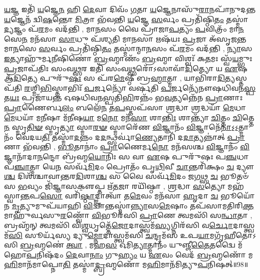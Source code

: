  \ul{𑌯}\-𑌜𑍍𑌞 𑌇𑌤𑌿᳴ \ul{𑌯}\-𑌜𑍍𑌞𑍇\-\ul{𑌨} 𑌹𑌿 \ul{𑌦𑍇}\-𑌵𑌾 𑌦𑌿𑌵𑌂᳴ \ul{𑌗}\-𑌤𑌾 \ul{𑌯}\-𑌜𑍍𑌞𑍇𑌨𑌾𑌸𑍁᳴\-\ul{𑌰𑌾}\-𑌨𑌪𑌾᳴𑌨𑍁𑌦𑌨𑍍𑌤 \ul{𑌯}\-𑌜𑍍𑌞𑍇𑌨᳴ 𑌦𑍍𑌵𑌿\-\ul{𑌷}\-𑌨𑍍𑌤𑍋 \ul{𑌮𑌿}\-𑌤𑍍𑌰𑌾 𑌭᳴𑌵𑌨𑍍𑌤𑌿 \ul{𑌯}\-𑌜𑍍𑌞𑍇 \ul{𑌸}\-𑌰𑍍𑌵𑌂 𑌪𑍍𑌰𑌤𑌿᳴𑌷𑍍𑌠𑌿\-\ul{𑌤𑌂} 𑌤𑌸𑍍𑌮𑌾॑\-\ul{𑌦𑍍𑌯}\-𑌜𑍍𑌞𑌂 𑌪᳴\-\ul{𑌰}\-𑌮𑌂 𑌵𑌦᳴𑌨𑍍𑌤𑌿 \sep 
 𑌮𑌾\-\ul{𑌨}\-𑌸𑌂 𑌵𑍈 𑌪𑍍𑌰𑌾᳴𑌜𑌾\-\ul{𑌪}\-𑌤𑍍𑌯𑌂 \ul{𑌪}\-𑌵𑌿𑌤𑍍𑌰𑌂᳴ 𑌮𑌾\-\ul{𑌨}\-𑌸𑍇\-\ul{𑌨} 𑌮𑌨᳴𑌸𑌾 \ul{𑌸𑌾}\-𑌧𑍁 𑌪᳴𑌶𑍍𑌯𑌤𑌿 𑌮𑌾\-\ul{𑌨}\-𑌸𑌾 𑌋𑌷᳴𑌯𑌃 \ul{𑌪𑍍𑌰}\-𑌜𑌾 𑌅᳴𑌸𑍃𑌜𑌨𑍍𑌤 𑌮𑌾\-\ul{𑌨}\-𑌸𑍇 \ul{𑌸}\-𑌰𑍍𑌵𑌂 𑌪𑍍𑌰𑌤𑌿᳴𑌷𑍍𑌠𑌿\-\ul{𑌤𑌂} 𑌤𑌸𑍍𑌮𑌾॑𑌨𑍍𑌮𑌾\-\ul{𑌨}\-𑌸𑌂 𑌪᳴\-\ul{𑌰}\-𑌮𑌂 𑌵𑌦᳴𑌨𑍍𑌤𑌿 \sep
 \ul{𑌨𑍍𑌯𑌾}\-𑌸 \ul{𑌇}\-𑌤𑍍𑌯𑌾𑌹𑍁᳴𑌰𑍍𑌮\-\ul{𑌨𑍀}\-𑌷𑌿𑌣𑍋॑ \ul{𑌬𑍍𑌰}\-𑌹𑍍𑌮𑌾𑌣𑌂᳴ \ul{𑌬𑍍𑌰}\-𑌹𑍍𑌮𑌾 𑌵𑌿𑌶𑍍𑌵𑌃᳴ 𑌕\-\ul{𑌤}\-𑌮𑌃 𑌸𑍍𑌵᳴\-\ul{𑌯}\-𑌮𑍍𑌭𑍁𑌃 \ul{𑌪𑍍𑌰}\-𑌜𑌾𑌪᳴𑌤𑌿𑌃 𑌸𑌂𑌵\-\ul{𑌥𑍍𑌸}\-𑌰 𑌇𑌤𑌿᳴ 𑌸𑌂𑌵\-\ul{𑌥𑍍𑌸}\-𑌰𑍋᳴𑌽𑌸𑌾𑌵𑌾᳴\-\ul{𑌦𑌿}\-𑌤𑍍𑌯𑍋 𑌯 \ul{𑌏}\-𑌷 𑌆᳴\-\ul{𑌦𑌿}\-𑌤𑍍𑌯𑍇 𑌪𑍁𑌰𑍁᳴\-\ul{𑌷𑌃} 𑌸 𑌪᳴𑌰\-\ul{𑌮𑍇}\-𑌷𑍍𑌠𑍀 𑌬𑍍𑌰\-\ul{𑌹𑍍𑌮𑌾}\-𑌤𑍍𑌮𑌾 \sep
 𑌯𑌾𑌭𑌿᳴𑌰𑌾\-\ul{𑌦𑌿}\-𑌤𑍍𑌯𑌸𑍍𑌤𑌪᳴𑌤𑌿 \ul{𑌰}\-𑌶𑍍𑌮𑌿\-\ul{𑌭𑌿}\-𑌸𑍍𑌤𑌾𑌭𑌿𑌃᳴ \ul{𑌪}\-𑌰𑍍𑌜𑌨𑍍𑌯𑍋᳴ 𑌵𑌰𑍍\mbox{}𑌷𑌤𑌿 \ul{𑌪}\-𑌰𑍍𑌜𑌨𑍍𑌯𑍇᳴𑌨𑍗𑌷𑌧𑌿𑌵𑌨\-\ul{𑌸𑍍𑌪}\-𑌤\-\ul{𑌯𑌃} 𑌪𑍍𑌰𑌜𑌾᳴𑌯𑌨𑍍𑌤 𑌓𑌷𑌧𑌿𑌵𑌨\-\ul{𑌸𑍍𑌪}\-𑌤𑌿\-\ul{𑌭𑌿}\-𑌰𑌨𑍍𑌨𑌂᳴ 𑌭\-\ul{𑌵}\-𑌤𑍍𑌯𑌨𑍍𑌨𑍇᳴𑌨 \ul{𑌪𑍍𑌰𑌾}\-𑌣𑌾𑌃 \ul{𑌪𑍍𑌰𑌾}\-𑌣𑍈𑌰𑍍𑌬\-\ul{𑌲𑌂} 𑌬𑌲𑍇᳴\-\ul{𑌨} 𑌤\-\ul{𑌪}\-𑌸𑍍𑌤𑌪᳴𑌸𑌾 \ul{𑌶𑍍𑌰}\-𑌦𑍍𑌧𑌾 \ul{𑌶𑍍𑌰}\-𑌦𑍍𑌧𑌯𑌾᳴ \ul{𑌮𑍇}\-𑌧𑌾 \ul{𑌮𑍇}\-𑌧𑌯𑌾᳴ 𑌮\-\ul{𑌨𑍀}\-𑌷𑌾 𑌮᳴\-\ul{𑌨𑍀}\-𑌷\-\ul{𑌯𑌾} 𑌮\-\ul{𑌨𑍋} 𑌮𑌨᳴\-\ul{𑌸𑌾} 𑌶𑌾\-\ul{𑌨𑍍𑌤𑌿𑌃} 𑌶𑌾𑌨𑍍𑌤𑍍𑌯𑌾᳴ \ul{𑌚𑌿}\-𑌤𑍍𑌤𑌂 \ul{𑌚𑌿}\-𑌤𑍍𑌤𑍇\-\ul{𑌨} 𑌸𑍍𑌮𑍃\-\ul{𑌤𑌿}\-\-\ul{𑍟} 𑌸𑍍𑌮𑍃\-\ul{𑌤𑍍𑌯𑌾} 𑌸𑍍𑌮𑌾\-\ul{𑌰}\-\-\ul{𑍟} 𑌸𑍍𑌮𑌾𑌰𑍇᳴𑌣 \ul{𑌵𑌿}\-𑌜𑍍𑌞𑌾𑌨𑌂᳴  \ul{𑌵𑌿}\-𑌜𑍍𑌞𑌾𑌨𑍇᳴\-\ul{𑌨𑌾}\-𑌽॒𑌽॒𑌤𑍍𑌮𑌾𑌨𑌂᳴ 𑌵𑍇𑌦𑌯\-\ul{𑌤𑌿} 𑌤𑌸𑍍𑌮𑌾᳴\-\ul{𑌦}\-𑌨𑍍𑌨𑌂 𑌦\-\ul{𑌦}\-𑌨𑍍𑌥𑍍𑌸𑌰𑍍𑌵𑌾॑\-\ul{𑌣𑍍𑌯𑍇}\-𑌤𑌾𑌨𑌿᳴ 𑌦\-\ul{𑌦𑌾}\-𑌤𑍍𑌯𑌨𑍍𑌨𑌾॑𑌤𑍍 \ul{𑌪𑍍𑌰𑌾}\-𑌣𑌾 𑌭᳴𑌵𑌨𑍍𑌤𑌿 \sep
  \ul{𑌭𑍂}\-𑌤𑌾𑌨𑌾𑌂॑ \ul{𑌪𑍍𑌰𑌾}\-𑌣𑍈𑌰𑍍𑌮\-\ul{𑌨𑍋} 𑌮𑌨᳴𑌸𑌶𑍍𑌚 \ul{𑌵𑌿}\-𑌜𑍍𑌞𑌾𑌨𑌂᳴  \ul{𑌵𑌿}\-𑌜𑍍𑌞𑌾𑌨𑌾᳴𑌦𑌾\-\ul{𑌨}\-𑌨𑍍𑌦𑍋 𑌬𑍍𑌰᳴𑌹𑍍𑌮\-\ul{𑌯𑍋}\-𑌨𑌿𑌃 𑌸 𑌵𑌾 \ul{𑌏}\-𑌷 𑌪𑍁𑌰𑍁᳴𑌷𑌃 𑌪\-\ul{𑌞𑍍𑌚}\-𑌧𑌾 𑌪᳴\-\ul{𑌞𑍍𑌚𑌾}\-𑌤𑍍𑌮𑌾 𑌯𑍇\-\ul{𑌨} 𑌸𑌰𑍍𑌵᳴\-\ul{𑌮𑌿}\-𑌦𑌂 𑌪𑍍𑌰𑍋𑌤𑌂᳴ 𑌪𑍃\-\ul{𑌥𑌿}\-𑌵𑍀 \ul{𑌚𑌾}\-𑌨𑍍𑌤𑌰𑌿᳴𑌕𑍍𑌷𑌂 \ul{𑌚} 𑌦𑍍𑌯𑍗\-\ul{𑌶𑍍𑌚} 𑌦𑌿𑌶᳴𑌶𑍍𑌚𑌾𑌵𑌾𑌨𑍍𑌤𑌰\-\ul{𑌦𑌿}\-𑌶𑌾\-\ul{𑌶𑍍𑌚} 𑌸 𑌵𑍈 𑌸𑌰𑍍𑌵᳴\-\ul{𑌮𑌿}\-𑌦𑌂 𑌜\-\ul{𑌗}\-𑌥𑍍𑌸 \ul{𑌚} 𑌭𑍂𑌤𑍞᳴ 𑌸 \ul{𑌭}\-𑌵𑍍𑌯𑌂 𑌜𑌿᳴𑌜𑍍𑌞𑌾𑌸𑌕𑍢॒𑌪𑍍𑌤 𑌋᳴\-\ul{𑌤}\-𑌜𑌾 𑌰𑌯𑌿᳴𑌷𑍍𑌠𑌾 \sep
  \ul{𑌶𑍍𑌰}\-𑌦𑍍𑌧𑌾 \ul{𑌸}\-𑌤𑍍𑌯𑍋 𑌮𑌹᳴𑌸𑍍𑌵𑌾\-\ul{𑌨𑍍𑌤}\-𑌪\-\ul{𑌸𑍋} 𑌵𑌰𑌿᳴\-\ul{𑌷𑍍𑌠𑌾}\-𑌦𑍍𑌜𑍍𑌞𑌾𑌤𑍍𑌵𑌾᳴ 𑌤\-\ul{𑌮𑍇}\-𑌵𑌂 𑌮𑌨᳴𑌸𑌾 \ul{𑌹𑍃}\-𑌦𑌾 \ul{𑌚} 𑌭𑍂𑌯𑍋᳴ 𑌨 \ul{𑌮𑍃}\-𑌤𑍍𑌯𑍁𑌮𑍁𑌪᳴𑌯𑌾𑌹𑌿 \ul{𑌵𑌿}\-𑌦𑍍𑌵𑌾𑌨𑍍𑌤𑌸𑍍𑌮𑌾॑\-\ul{𑌨𑍍𑌨𑍍𑌯𑌾}\-𑌸\-\ul{𑌮𑍇}\-𑌷𑌾𑌂 𑌤𑌪᳴𑌸𑌾𑌮𑌤𑌿𑌰𑌿\-\ul{𑌕𑍍𑌤}\-𑌮𑌾𑌹𑍁᳴𑌰𑍍𑌵𑌸𑍁\-\ul{𑌰}\-𑌣𑍍𑌵𑍋᳴ \ul{𑌵𑌿}\-𑌭𑍂𑌰᳴𑌸𑌿 \ul{𑌪𑍍𑌰𑌾}\-𑌣𑍇 𑌤𑍍𑌵𑌮𑌸𑌿᳴ 𑌸\-\ul{𑌨𑍍𑌧𑌾}\-𑌤𑌾 \sep 
 𑌬𑍍𑌰𑌹𑍍𑌮᳴𑌨𑍍 𑌤𑍍𑌵𑌮𑌸𑌿᳴ 𑌵𑌿\-\ul{𑌶𑍍𑌵}\-𑌧𑍃𑌤𑍍𑌤𑍇᳴\-\ul{𑌜𑍋}\-𑌦𑌾𑌸𑍍𑌤𑍍𑌵𑌮᳴\-\ul{𑌸𑍍𑌯}\-𑌗𑍍𑌨𑌿𑌰᳴𑌸𑌿 𑌵\-\ul{𑌰𑍍𑌚𑍋}\-𑌦𑌾𑌸𑍍𑌤𑍍𑌵𑌮᳴\-\ul{𑌸𑌿} 𑌸𑍂𑌰𑍍𑌯᳴𑌸𑍍𑌯 𑌦𑍍𑌯𑍁\-\ul{𑌮𑍍𑌨𑍋}\-𑌦𑌾𑌸𑍍𑌤𑍍𑌵𑌮᳴𑌸𑌿 \ul{𑌚}\-𑌨𑍍𑌦𑍍𑌰𑌮᳴𑌸 𑌉𑌪\-\ul{𑌯𑌾}\-𑌮𑌗𑍃᳴𑌹𑍀𑌤𑍋𑌽𑌸𑌿 \ul{𑌬𑍍𑌰}\-𑌹𑍍𑌮𑌣𑍇॑ \ul{𑌤𑍍𑌵𑌾} \sep
 𑌮𑌹\-\ul{𑌸} 𑌓𑌮𑌿\-\ul{𑌤𑍍𑌯𑌾}\-𑌤𑍍𑌮𑌾𑌨𑌂᳴ 𑌯𑍁𑌞𑍍𑌜𑍀\-\ul{𑌤𑍈}\-𑌤𑌦𑍍𑌵𑍈 𑌮᳴𑌹𑍋\-\ul{𑌪}\-𑌨𑌿𑌷᳴𑌦𑌂 \ul{𑌦𑍇}\-𑌵𑌾\-\ul{𑌨𑌾𑌂} 𑌗𑍁\-\ul{𑌹𑍍𑌯𑌂} 𑌯 \ul{𑌏}\-𑌵𑌂 𑌵𑍇𑌦᳴ \ul{𑌬𑍍𑌰}\-𑌹𑍍𑌮𑌣𑍋᳴ 𑌮\-\ul{𑌹𑌿}\-𑌮𑌾𑌨᳴𑌮𑌾𑌪𑍍𑌨𑍋\-\ul{𑌤𑌿} 𑌤𑌸𑍍𑌮𑌾॑\-\ul{𑌦𑍍𑌬𑍍𑌰}\-𑌹𑍍𑌮𑌣𑍋᳴ 𑌮\-\ul{𑌹𑌿}\-𑌮𑌾𑌨᳴𑌮𑌿𑌤𑍍𑌯𑍁\-\ul{𑌪}\-𑌨𑌿𑌷𑌤𑍍॥98॥\anuvakamend



